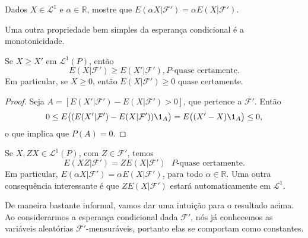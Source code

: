 \documentclass[../Notas_de_aula.tex]{subfiles}
\begin{document}
\begin{exercise}
  Dados $X \in \mathcal{L}^1$ e $\alpha \in \mathbb{R}$, mostre que $E(\alpha X|\mathcal{F}') = \alpha E(X|\mathcal{F}')$.
\end{exercise}

Uma outra propriedade bem simples da esperança condicional é a monotonicidade.

\begin{lemma}
  \label{l:ec_mono}
  Se $X \geq X'$ em $\mathcal{L}^1(P)$, então
  \begin{equation}
    E(X|\mathcal{F}') \geq E(X'|\mathcal{F}'), \text{$P$-quase certamente.}
  \end{equation}
  Em particular, se $X \geq 0$, então $E(X|\mathcal{F}') \geq 0$ quase certamente.
\end{lemma}

\begin{proof}
  Seja $A = [E(X'|\mathcal{F}') - E(X|\mathcal{F}') > 0]$, que pertence a $\mathcal{F}'$.
  Então
  \begin{equation}
    0 \leq E\big( (E(X'|\mathcal{F}') - E(X|\mathcal{F}')) \1_A \big) = E\big((X' - X) \1_A\big) \leq 0,
  \end{equation}
  o que implica que $P(A) = 0$.
\end{proof}

\begin{proposition}
  \label{p:EZX_ZEX}
  Se $X, ZX \in \mathcal{L}^1(P)$, com $Z \in \mathcal{F}'$, temos
  \begin{equation}
    E(XZ|\mathcal{F}') = Z E(X|\mathcal{F}') \text{ $P$-quase certamente}.
  \end{equation}
  Em particular, $E(\alpha X|\mathcal{F}') = \alpha E(X|\mathcal{F}')$, para todo $\alpha \in \mathbb{R}$.
  Uma outra consequência interessante é que $Z E(X|\mathcal{F}')$ estará automaticamente em $\mathcal{L}^1$.
\end{proposition}

De maneira bastante informal, vamos dar uma intuição para o resultado acima.
Ao considerarmos a esperança condicional dada $\mathcal{F}'$, nós já conhecemos as variáveis aleatórias $\mathcal{F}'$-mensuráveis, portanto elas se comportam como constantes.
\end{document}

